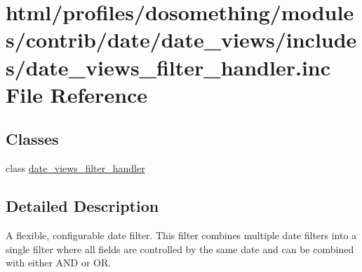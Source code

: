 \hypertarget{date__views__filter__handler_8inc}{
\section{html/profiles/dosomething/modules/contrib/date/date\_\-views/includes/date\_\-views\_\-filter\_\-handler.inc File Reference}
\label{date__views__filter__handler_8inc}
}
\subsection*{Classes}
\begin{DoxyCompactItemize}
\item 
class \hyperlink{classdate__views__filter__handler}{date\_\-views\_\-filter\_\-handler}
\end{DoxyCompactItemize}


\subsection{Detailed Description}
A flexible, configurable date filter. This filter combines multiple date filters into a single filter where all fields are controlled by the same date and can be combined with either AND or OR. 